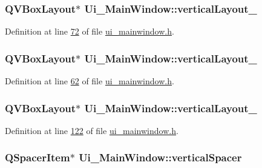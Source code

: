 \hypertarget{a00027_afcc20a3d5058037a00cdc6122f231848}{
\subsubsection[{vertical\+Layout\+\_\+5}]{\setlength{\rightskip}{0pt plus 5cm}Q\+V\+Box\+Layout$\ast$ Ui\+\_\+\+Main\+Window\+::vertical\+Layout\+\_}}\label{a00027_afcc20a3d5058037a00cdc6122f231848}


Definition at line \hyperlink{a00052_source_l00072}{72} of file \hyperlink{a00052_source}{ui\+\_\+mainwindow.\+h}.

\hypertarget{a00027_a93c190b085c63a667c535ba0bbcfec7c}{
\subsubsection[{vertical\+Layout\+\_\+6}]{\setlength{\rightskip}{0pt plus 5cm}Q\+V\+Box\+Layout$\ast$ Ui\+\_\+\+Main\+Window\+::vertical\+Layout\+\_}}\label{a00027_a93c190b085c63a667c535ba0bbcfec7c}


Definition at line \hyperlink{a00052_source_l00062}{62} of file \hyperlink{a00052_source}{ui\+\_\+mainwindow.\+h}.

\hypertarget{a00027_a7b66d5d6ab55f3977317359d09a42345}{
\subsubsection[{vertical\+Layout\+\_\+7}]{\setlength{\rightskip}{0pt plus 5cm}Q\+V\+Box\+Layout$\ast$ Ui\+\_\+\+Main\+Window\+::vertical\+Layout\+\_}}\label{a00027_a7b66d5d6ab55f3977317359d09a42345}


Definition at line \hyperlink{a00052_source_l00122}{122} of file \hyperlink{a00052_source}{ui\+\_\+mainwindow.\+h}.

\hypertarget{a00027_a8384329c3663ff274e926a12024aab52}{
\subsubsection[{vertical\+Spacer}]{\setlength{\rightskip}{0pt plus 5cm}Q\+Spacer\+Item$\ast$ Ui\+\_\+\+Main\+Window\+::vertical\+Spacer}}\label{a00027_a8384329c3663ff274e926a12024aab52}



